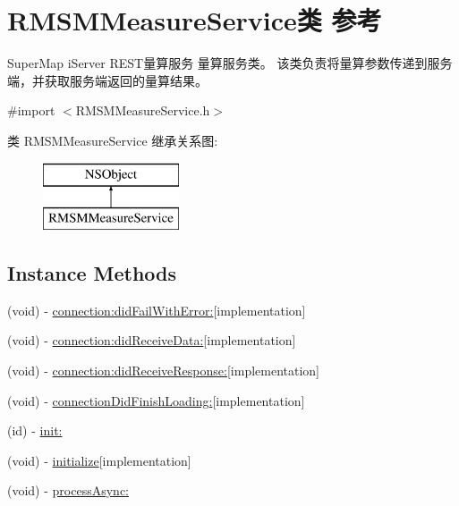 \hypertarget{interface_r_m_s_m_measure_service}{\section{R\-M\-S\-M\-Measure\-Service类 参考}
\label{interface_r_m_s_m_measure_service}
}


Super\-Map i\-Server R\-E\-S\-T量算服务 量算服务类。 该类负责将量算参数传递到服务端，并获取服务端返回的量算结果。  




{\ttfamily \#import $<$R\-M\-S\-M\-Measure\-Service.\-h$>$}

类 R\-M\-S\-M\-Measure\-Service 继承关系图\-:\begin{figure}[H]
\begin{center}
\leavevmode
\includegraphics[height=2.000000cm]{interface_r_m_s_m_measure_service}
\end{center}
\end{figure}
\subsection*{Instance Methods}
\begin{DoxyCompactItemize}
\item 
(void) -\/ \hyperlink{interface_r_m_s_m_measure_service_adbd9a0566ebefe0cb8d56ce40aae7207}{connection\-:did\-Fail\-With\-Error\-:}{\ttfamily  \mbox{[}implementation\mbox{]}}
\item 
(void) -\/ \hyperlink{interface_r_m_s_m_measure_service_a48604e2449a8262eb0c25b1002fa5df1}{connection\-:did\-Receive\-Data\-:}{\ttfamily  \mbox{[}implementation\mbox{]}}
\item 
(void) -\/ \hyperlink{interface_r_m_s_m_measure_service_aa32fae498fb225e571a74b1a7c97d73f}{connection\-:did\-Receive\-Response\-:}{\ttfamily  \mbox{[}implementation\mbox{]}}
\item 
(void) -\/ \hyperlink{interface_r_m_s_m_measure_service_aa5f3e198c28d13f866a9dd900af3f179}{connection\-Did\-Finish\-Loading\-:}{\ttfamily  \mbox{[}implementation\mbox{]}}
\item 
(id) -\/ \hyperlink{interface_r_m_s_m_measure_service_a3ef231598aab2f538c53c57599081bad}{init\-:}
\item 
(void) -\/ \hyperlink{interface_r_m_s_m_measure_service_a9e73f651c6d76038f9c5381ad311b8b4}{initialize}{\ttfamily  \mbox{[}implementation\mbox{]}}
\item 
(void) -\/ \hyperlink{interface_r_m_s_m_measure_service_a8a05b6a314163eb5d1bbaf6167902994}{process\-Async\-:}
\end{DoxyCompactItemize}

